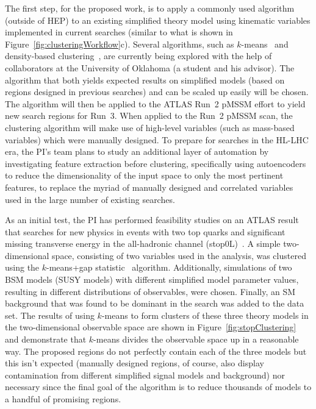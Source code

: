 \documentclass[letter, USenglish, 11pt, subfigure]{article}
\begin{document}
The first step, for the proposed work, is to apply a commonly used algorithm (outside of HEP) to an existing simplified theory model using kinematic variables implemented in current searches (similar to what is shown in Figure~\ref{fig:clusteringWorkflow}c). Several algorithms, such as $k$-means~\cite{kmeans} and density-based clustering~\cite{dbscan}, are currently being explored with the help of collaborators at the University of Oklahoma (a student and his advisor). The algorithm that both yields expected results on simplified models (based on regions designed in previous searches) and can be scaled up easily will be chosen. The algorithm will then be applied to the ATLAS Run~2 pMSSM effort to yield new search regions for Run~3. When applied to the Run~2 pMSSM scan, the clustering algorithm will make use of high-level variables (such as mass-based variables) which were manually designed. To prepare for searches in the HL-LHC era, the PI's team plans to study an additional layer of automation by investigating feature extraction before clustering, specifically using autoencoders to reduce the dimensionality of the input space to only the most pertinent features, to replace the myriad of manually designed and correlated variables used in the large number of existing searches. 

As an initial test, the PI has performed feasibility studies on an ATLAS result that searches for new physics in events with two top quarks and significant missing transverse energy in the all-hadronic channel (stop0L)~\cite{stop0L_3}. A simple two-dimensional space, consisting of two variables used in the analysis, was clustered using the $k$-means+gap statistic~\cite{Tibishirani} algorithm. Additionally, simulations of two BSM models (SUSY models) with different simplified model parameter values, resulting in different distributions of observables, were chosen. Finally, an SM background that was found to be dominant in the search was added to the data set. The results of using $k$-means to form clusters of these three theory models in the two-dimensional observable space are shown in Figure~\ref{fig:stopClustering} and demonstrate that $k$-means divides the observable space up in a reasonable way. The proposed regions do not perfectly contain each of the three models but this isn't expected (manually designed regions, of course, also display contamination from different simplified signal models and background) nor necessary since the final goal of the algorithm is to reduce thousands of models to a handful of promising regions.%
\end{document}
